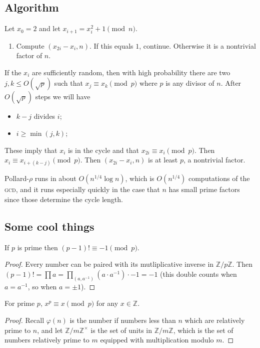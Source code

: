 \subsection{Algorithm}

Let $x_0 = 2$ and let $x_{i+1} = x_i^2 + 1 \pmod{n}$.
\begin{enumerate}[label = {Step~\arabic*.}]
\item Compute $(x_{2i} - x_i,n)$. If this equals $1$, continue. Otherwise it is a nontrivial factor of $n$.
\end{enumerate}

If the $x_i$ are sufficiently random, then with high probability there are two $j,k \leq O(\sqrt{p})$ such that $x_j \equiv x_k \pmod{p}$ where $p$ is any divisor of $n$. After $O(\sqrt{p})$ steps we will have
\begin{itemize}
\item $k-j$ divides $i$;
\item $i \geq \min(j,k);$
\end{itemize}
These imply that $x_i$ is in the cycle and that $x_{2i} \equiv x_i \pmod{p}$. Then $x_i \equiv x_{i + (k-j)} \pmod{p}$. Then $(x_{2i}-x_i,n)$ is at least $p$, a nontrivial factor.

Pollard-$\rho$ runs in about $O(n^{1/4}\log n)$, which is $O(n^{1/4})$ computations of the \textsc{gcd}, and it runs especially quickly in the case that $n$ has small prime factors since those determine the cycle length.

\subsection{Some cool things}

\begin{theorem}
If $p$ is prime then $(p-1)! \equiv -1 \pmod{p}$.
\end{theorem}

\begin{proof}
Every number can be paired with its mutliplicative inverse in $\mathbb{Z}/p\mathbb{Z}$. Then $(p-1)! = \prod a = \prod_{(a,a^{-1})}(a \cdot a^{-1}) \cdot -1 = -1$ (this double counts when $a = a^{-1}$, so when $a=\pm 1$).
\end{proof}

\begin{theorem}
For prime $p$, $x^p \equiv x \pmod{p}$ for any $x \in \mathbb{Z}$.
\end{theorem}

\begin{proof}
Recall $\varphi(n)$ is the number if numbers less than $n$ which are relatively prime to $n$, and let $\mathbb{Z}/m\mathbb{Z}^\times$ is the set of units in $\mathbb{Z}/m\mathbb{Z}$, which is the set of numbers relatively prime to $m$ equipped with multiplication modulo $m$.
\end{proof}